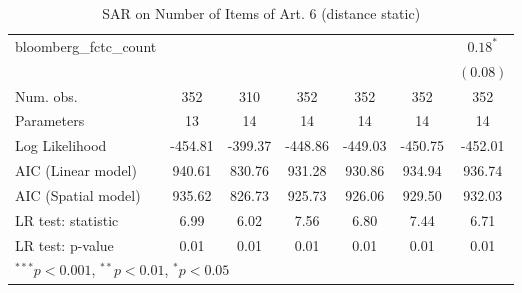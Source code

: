 \begin{table}[!h]
\begin{center}
\begin{tabular}{l c c c c c c }
bloomberg\_fctc\_count  &               &              &               &              &               & $0.18^{*}$    \\
                        &               &              &               &              &               & $(0.08)$      \\
\midrule
Num. obs.               & 352           & 310          & 352           & 352          & 352           & 352           \\
Parameters              & 13            & 14           & 14            & 14           & 14            & 14            \\
Log Likelihood          & -454.81       & -399.37      & -448.86       & -449.03      & -450.75       & -452.01       \\
AIC (Linear model)      & 940.61        & 830.76       & 931.28        & 930.86       & 934.94        & 936.74        \\
AIC (Spatial model)     & 935.62        & 826.73       & 925.73        & 926.06       & 929.50        & 932.03        \\
LR test: statistic      & 6.99          & 6.02         & 7.56          & 6.80         & 7.44          & 6.71          \\
LR test: p-value        & 0.01          & 0.01         & 0.01          & 0.01         & 0.01          & 0.01          \\
\bottomrule
\multicolumn{7}{l}{\scriptsize{$^{***}p<0.001$, $^{**}p<0.01$, $^*p<0.05$}}
\end{tabular}
\caption{SAR on Number of Items of Art. 6 (distance static)}
\label{table:coefficients}
\end{center}
\end{table}
